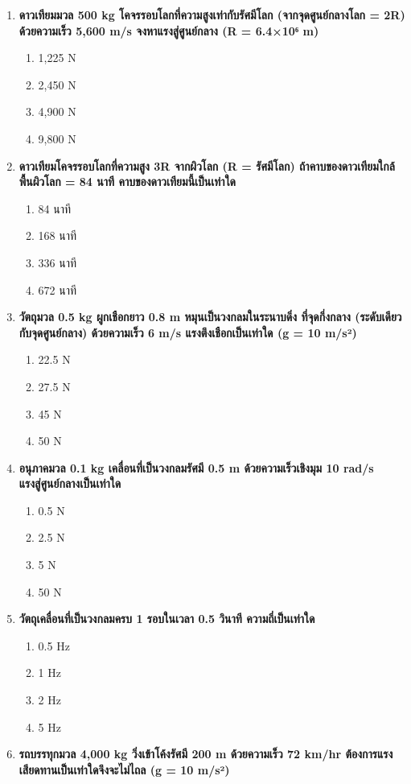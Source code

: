 \documentclass[12pt]{article}
\begin{document}
\begin{enumerate}
\item \textbf{ดาวเทียมมวล 500 kg โคจรรอบโลกที่ความสูงเท่ากับรัศมีโลก (จากจุดศูนย์กลางโลก = 2R) ด้วยความเร็ว 5,600 m/s จงหาแรงสู่ศูนย์กลาง (R = 6.4×10⁶ m)}
\begin{enumerate}[label=\alph*)]
\item 1,225 N
\item 2,450 N
\item 4,900 N
\item 9,800 N
\end{enumerate}
\item \textbf{ดาวเทียมโคจรรอบโลกที่ความสูง 3R จากผิวโลก (R = รัศมีโลก) ถ้าคาบของดาวเทียมใกล้พื้นผิวโลก = 84 นาที คาบของดาวเทียมนี้เป็นเท่าใด}
\begin{enumerate}[label=\alph*)]
\item 84 นาที
\item 168 นาที
\item 336 นาที
\item 672 นาที
\end{enumerate}
\item \textbf{วัตถุมวล 0.5 kg ผูกเชือกยาว 0.8 m หมุนเป็นวงกลมในระนาบดิ่ง ที่จุดกึ่งกลาง (ระดับเดียวกับจุดศูนย์กลาง) ด้วยความเร็ว 6 m/s แรงตึงเชือกเป็นเท่าใด (g = 10 m/s²)}
\begin{enumerate}[label=\alph*)]
\item 22.5 N
\item 27.5 N
\item 45 N
\item 50 N
\end{enumerate}
\item \textbf{อนุภาคมวล 0.1 kg เคลื่อนที่เป็นวงกลมรัศมี 0.5 m ด้วยความเร็วเชิงมุม 10 rad/s แรงสู่ศูนย์กลางเป็นเท่าใด}
\begin{enumerate}[label=\alph*)]
\item 0.5 N
\item 2.5 N
\item 5 N
\item 50 N
\end{enumerate}
\item \textbf{วัตถุเคลื่อนที่เป็นวงกลมครบ 1 รอบในเวลา 0.5 วินาที ความถี่เป็นเท่าใด}
\begin{enumerate}[label=\alph*)]
\item 0.5 Hz
\item 1 Hz
\item 2 Hz
\item 5 Hz
\end{enumerate}
\item \textbf{รถบรรทุกมวล 4,000 kg วิ่งเข้าโค้งรัศมี 200 m ด้วยความเร็ว 72 km/hr ต้องการแรงเสียดทานเป็นเท่าใดจึงจะไม่ไถล (g = 10 m/s²)}

\end{enumerate}
\end{document}
